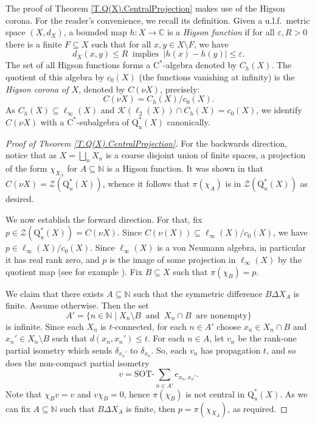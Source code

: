 \documentclass[11pt]{amsart}
\newcommand{\N}{\mathbb{N}}
\newcommand{\C}{\mathbb{C}}
\newcommand{\eps}{\varepsilon}
\newcommand{\SOTh}{\mathrm{SOT}\text{-}}
\newcommand{\cstu}{\mathrm{C}^*_u}
\newcommand{\roeq}{\mathrm{Q}^*_u}
\newcommand{\cstar}{$\mathrm{C}^*$}
\newcommand{\cZ}{\mathcal{Z}}
\newcommand{\bbN}{\mathbb{N}}
\numberwithin{equation}{section}
\theoremstyle{definition}
\theoremstyle{remark}
\numberwithin{equation}{section}
\begin{document}
The proof of Theorem \ref{T.Q(X).CentralProjection} makes use of the Higson corona. For the reader's convenience, we recall its definition. Given a u.l.f.\ metric space $(X,d_X)$, a bounded map $h\colon X\to \C$ is a \emph{Higson function} if for all $\eps,R>0$ there is a finite $F\subseteq X$ such that for all $x,y\in X\setminus F$, we have 
\[d_X(x,y)\leq R\ \text{ implies }\ |h(x)-h(y)|\leq \eps.\]
The set of all Higson functions forms a \cstar-algebra denoted by $C_h(X)$. The quotient of this algebra by $c_0(X)$ (the functions vanishing at infinity) is the \emph{Higson corona of $X$}, denoted by $C(\nu X)$, precisely: \[C(\nu X)=C_h(X)/c_0(X).\]
As $C_h(X)\subseteq \ell_\infty(X)$ and $\mathcal{K}(\ell_2(X))\cap C_h(X)=c_0(X)$, we identify $C(\nu X)$ with a \cstar-subalgebra of $ \roeq(X)$ canonically.

\begin{proof}[Proof of Theorem \ref{T.Q(X).CentralProjection}]
For the backwards direction, notice that as $X=\bigsqcup_nX_n$ is a coarse disjoint union of finite spaces, a projection of the form $\chi_{X_A}$ for $A\subseteq \bbN$ is a Higson function. It was shown in \cite[Proposition 3.6]{BaudierBragaFarahVignatiWillett2023} that $C(\nu X)=\cZ(\roeq(X))$, whence it follows that $\pi(\chi_A)$ is in $\cZ(\roeq(X))$ as desired. 

We now establish the forward direction. For that, fix $p\in \cZ(\roeq(X))=C(\nu X)$. Since $C(\nu(X))\subseteq \ell_\infty(X)/c_0(X)$, we have $p\in\ell_\infty(X)/c_0(X)$. %
Since $\ell_\infty(X)$ is a von Neumann algebra, in particular it has real rank zero, and $p$ is the image of some projection in $\ell_\infty(X)$ by the quotient map (see for example \cite[Lemma~3.1.13]{Fa:STCstar}). Fix $B\subseteq X$ such that $\pi(\chi_B)=p$. 
	
We claim that there exists $A\subseteq \bbN$ such that the symmetric difference $B\Delta X_A$ is finite. Assume otherwise. Then the set 
	\[
	A'=\{n\in\N \mid X_n\setminus B\ \text{ and }\ X_n\cap B\ \text{ are nonempty}\}
	\]
	is infinite. Since each $X_n$ is $t$-connected, for each $n\in A'$ choose $x_n\in X_n\cap B$ and $x_n'\in X_n\setminus B$ such that $d(x_n,x_n')\leq t$. For each $n\in A$, let $v_n$ be the rank-one partial isometry which sends $\delta_{x_n'}$ to $\delta_{x_n}$. So, each $v_n$ has propagation $t$, and so does the non-compact partial isometry
	\[
	v=\SOTh\sum_{n\in A'}e_{x_n,x_n'}.
	\] 
Note that $\chi_B v=v$ and $v\chi_B=0$, hence $\pi(\chi_B)$ is not central in $\roeq(X)$. 	As we can fix $A\subseteq \bbN$ such that $B\Delta X_A$ is finite, then $p=\pi( \chi_{X_A})$, as required. 
\end{proof}
\end{document}
